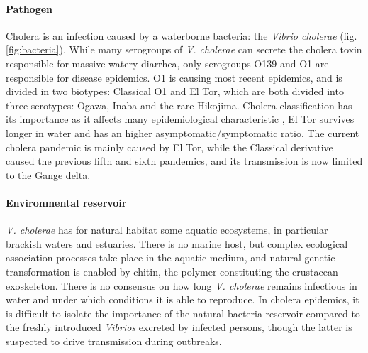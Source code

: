 \paragraph{Pathogen} Cholera is an infection caused by a waterborne bacteria: the \emph{Vibrio cholerae} (fig. \ref{fig:bacteria}). While many serogroups of \emph{V. cholerae} can secrete the cholera toxin responsible for massive watery diarrhea, only serogroups O139 and O1 are responsible for disease epidemics. O1 is causing most recent epidemics, and is divided in two biotypes: Classical O1 and El Tor, which are both divided into three serotypes: Ogawa, Inaba and the rare Hikojima\cite{Kaper:Cholera:1995}. Cholera classification has its importance as it affects many epidemiological characteristic \eg, El Tor survives longer in water and has an higher asymptomatic/symptomatic ratio\cite{WHO:CholeraVaccinesWHO:2017}. The current cholera pandemic is mainly caused by El Tor, while the Classical derivative caused the previous fifth and sixth pandemics, and its transmission is now limited to the Gange delta\cite{Nair:CholeraDueAltered:2006, Domman:DefiningEndemicCholera:2018}. 

 \paragraph{Environmental reservoir}  \textit{V. cholerae} has for natural habitat some aquatic ecosystems, in particular brackish waters and estuaries. There is no marine host, but complex ecological association processes take place in the aquatic medium, and natural genetic transformation is enabled by chitin, the polymer constituting the crustacean exoskeleton\cite{Reidl:VibrioCholeraeCholera:2002,Meibom:ChitinInducesNatural:2005}. There is no consensus on how long \textit{V. cholerae} remains infectious in water and under which conditions it is able to reproduce\cite{Mavian:ToxigenicVibrioCholerae:2020}. In cholera epidemics, it is difficult to isolate the importance of the natural bacteria reservoir compared to the freshly introduced \textit{Vibrios} excreted by infected persons, though the latter is suspected to drive transmission during outbreaks.

